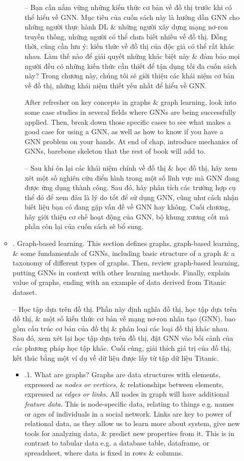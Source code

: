 \documentclass{article}
\begin{document}
\begin{itemize}
\begin{itemize}
\begin{itemize}
            -- Bạn cần nắm vững những kiến thức cơ bản về đồ thị trước khi có thể hiểu về GNN. Mục tiêu của cuốn sách này là hướng dẫn GNN cho những người thực hành DL \& những người xây dựng mạng nơ-ron truyền thống, những người có thể chưa biết nhiều về đồ thị. Đồng thời, cũng cần lưu ý: kiến thức về đồ thị của độc giả có thể rất khác nhau. Làm thế nào để giải quyết những khác biệt này \& đảm bảo mọi người đều có những kiến thức cần thiết để tận dụng tối đa cuốn sách này? Trong chương này, chúng tôi sẽ giới thiệu các khái niệm cơ bản về đồ thị, những khái niệm thiết yếu nhất để hiểu về GNN.

            After refresher on key concepts in graphs \& graph learning, look into some case studies in several fields where GNNs are being successfully applied. Then, break down those specific cases to see what makes a good case for using a GNN, as well as how to know if you have a GNN problem on your hands. At end of chap, introduce mechanics of GNNs, barebone skeleton that the rest of book will add to.

            -- Sau khi ôn lại các khái niệm chính về đồ thị \& học đồ thị, hãy xem xét một số nghiên cứu điển hình trong một số lĩnh vực mà GNN đang được ứng dụng thành công. Sau đó, hãy phân tích các trường hợp cụ thể đó để xem đâu là lý do tốt để sử dụng GNN, cũng như cách nhận biết liệu bạn có đang gặp vấn đề về GNN hay không. Cuối chương, hãy giới thiệu cơ chế hoạt động của GNN, bộ khung xương cốt mà phần còn lại của cuốn sách sẽ bổ sung.
        \end{itemize}
        \item {. Graph-based learning.} This section defines graphs, graph-based learning, \& some fundamentals of GNNs, including basic structure of a graph \& a taxonomy of different types of graphs. Then, review graph-based learning, putting GNNs in context with other learning methods. Finally, explain value of graphs, ending with an example of data derived from Titanic dataset.

        -- Học tập dựa trên đồ thị. Phần này định nghĩa đồ thị, học tập dựa trên đồ thị, \& một số kiến thức cơ bản về mạng nơ-ron nhân tạo (GNN), bao gồm cấu trúc cơ bản của đồ thị \& phân loại các loại đồ thị khác nhau. Sau đó, xem xét lại học tập dựa trên đồ thị, đặt GNN vào bối cảnh của các phương pháp học tập khác. Cuối cùng, giải thích giá trị của đồ thị, kết thúc bằng một ví dụ về dữ liệu được lấy từ tập dữ liệu Titanic.
        \begin{itemize}
            \item {.1. What are graphs?} Graphs are data structures with elements, expressed as {\it nodes or vertices}, \& relationships between elements, expressed as {\it edges or links}. All nodes in graph will have additional {\it feature data}. This is node-specific data, relating to things e.g. names or ages of individuals in a social network. Links are key to power of relational data, as they allow us to learn more about system, give new tools for analyzing data, \& predict new properties from it. This is in contrast to tabular data e.g. a database table, dataframe, or spreadsheet, where data is fixed in rows \& columns.


\end{itemize}
\end{itemize}
\end{itemize}
\end{document}
